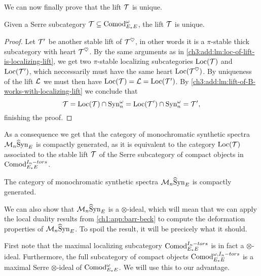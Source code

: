 We can now finally prove that the lift $\mathcal{T}$ is unique. 

\begin{theorem}
    \label{ch3:add:thm:uniqueness-of-lift}
    Given a Serre subcategory $\mathcal{T}\subseteq \mathrm{Comod}_{E_*E}^\omega$, the lift $\mathcal{T}$ is unique. 
\end{theorem}
\begin{proof}
    Let $\mathcal{T}'$ be another stable lift of $\mathcal{T}^\heartsuit$, in other words it is a $\pi$-stable thick subcategory with heart $\mathcal{T}^\heartsuit$. By the same arguments as in \cref{ch3:add:lm:loc-of-lift-is-localizing-lift}, we get two $\pi$-stable localizing subcategories $\operatorname{Loc}(\mathcal{T})$ and $\operatorname{Loc}(\mathcal{T}')$, which neccessarily must have the same heart $\operatorname{Loc}(\mathcal{T}^\heartsuit)$. By uniqueness of the lift $\mathcal{L}$ we must then have $\operatorname{Loc}(\mathcal{T}) = \mathcal{L} = \operatorname{Loc}(\mathcal{T}')$. By \cref{ch3:add:lm:lift-of-B-works-with-localizing-lift} we conclude that 
    \[\mathcal{T} = \operatorname{Loc}(\mathcal{T})\cap \mathrm{Syn}_{n}^\omega = \operatorname{Loc}(\mathcal{T}')\cap \mathrm{Syn}_{n}^\omega = \mathcal{T}',\]
    finishing the proof. 
\end{proof}

As a consequence we get that the category of monochromatic synthetic spectra $\mathcal{M}_{n}\widehat{\mathrm{S}}\mathrm{yn}_{E}$ is compactly generated, as it is equivalent to the category $\operatorname{Loc}(\mathcal{T})$ associated to the stable lift $\mathcal{T}$ of the Serre subcategory of compact objects in $\mathrm{Comod}_{E_*E}^{I_n-tors}$. 

\begin{corollary}
    The category of monochromatic synthetic spectra $\mathcal{M}_{n}\widehat{\mathrm{S}}\mathrm{yn}_{E}$ is compactly generated. 
\end{corollary}

We can also show that $\mathcal{M}_{n}\widehat{\mathrm{S}}\mathrm{yn}_{E}$ is a $\otimes$-ideal, which will mean that we can apply the local duality results from \cref{ch1:app:barr-beck} to compute the deformation properties of $\mathcal{M}_{n}\widehat{\mathrm{S}}\mathrm{yn}_{E}$. To spoil the result, it will be precicely what it should. 

First note that the maximal localizing subcategory $\mathrm{Comod}_{E_*E}^{I_n-tors}$ is in fact a $\otimes$-ideal. Furthermore, the full subcategory of compact objects $\mathrm{Comod}_{E_*E}^{\omega, I_n-tors}$ is a maximal Serre $\otimes$-ideal of $\mathrm{Comod}_{E_*E}^\omega$. We will use this to our advantage. 


